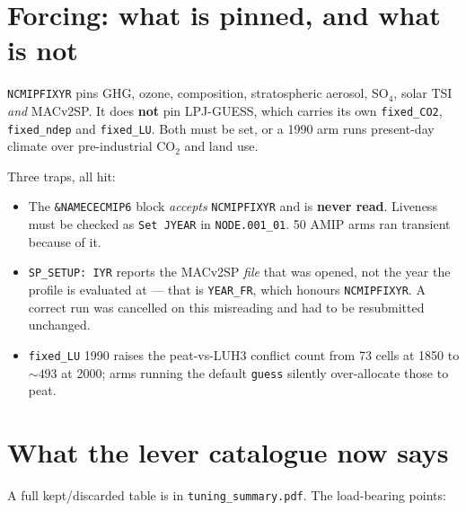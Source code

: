 \documentclass[10pt]{article}
\begin{document}
\section{Forcing: what is pinned, and what is not}\label{sec:forcing}
\texttt{NCMIPFIXYR} pins GHG, ozone, composition, stratospheric aerosol, SO$_4$, solar TSI
\emph{and} MACv2SP. It does \textbf{not} pin LPJ-GUESS, which carries its own
\texttt{fixed\_CO2}, \texttt{fixed\_ndep} and \texttt{fixed\_LU}. Both must be set, or a
1990 arm runs present-day climate over pre-industrial CO$_2$ and land use.

Three traps, all hit:
\begin{itemize}\itemsep1pt
\item The \texttt{\&NAMECECMIP6} block \emph{accepts} \texttt{NCMIPFIXYR} and is
\textbf{never read}. Liveness must be checked as \texttt{Set JYEAR} in
\texttt{NODE.001\_01}. 50 AMIP arms ran transient because of it.
\item \texttt{SP\_SETUP: IYR} reports the MACv2SP \emph{file} that was opened, not the year
the profile is evaluated at --- that is \texttt{YEAR\_FR}, which honours
\texttt{NCMIPFIXYR}. A correct run was cancelled on this misreading and had to be
resubmitted unchanged.
\item \texttt{fixed\_LU} 1990 raises the peat-vs-LUH3 conflict count from 73 cells at 1850
to ${\sim}493$ at 2000; arms running the default \texttt{guess} silently over-allocate
those to peat.
\end{itemize}

\section{What the lever catalogue now says}\label{sec:levers}
A full kept/discarded table is in \texttt{tuning\_summary.pdf}. The load-bearing points:
\end{document}
